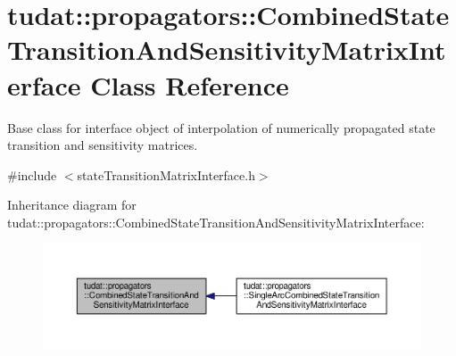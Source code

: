\hypertarget{classtudat_1_1propagators_1_1CombinedStateTransitionAndSensitivityMatrixInterface}{}\section{tudat\+:\+:propagators\+:\+:Combined\+State\+Transition\+And\+Sensitivity\+Matrix\+Interface Class Reference}
\label{classtudat_1_1propagators_1_1CombinedStateTransitionAndSensitivityMatrixInterface}


Base class for interface object of interpolation of numerically propagated state transition and sensitivity matrices.  




{\ttfamily \#include $<$state\+Transition\+Matrix\+Interface.\+h$>$}



Inheritance diagram for tudat\+:\+:propagators\+:\+:Combined\+State\+Transition\+And\+Sensitivity\+Matrix\+Interface\+:
\nopagebreak
\begin{figure}[H]
\begin{center}
\leavevmode
\includegraphics[width=350pt]{classtudat_1_1propagators_1_1CombinedStateTransitionAndSensitivityMatrixInterface__inherit__graph}
\end{center}
\end{figure}
